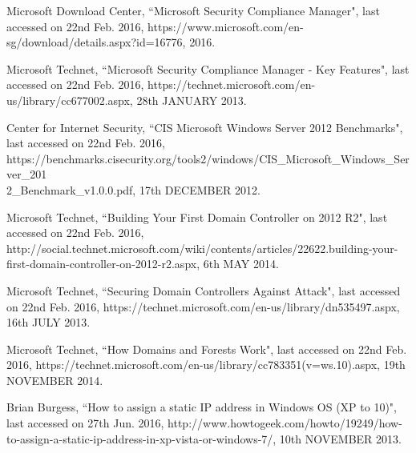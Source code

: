 \documentclass[12pt]{extarticle}
\begin{document}
\begin{thebibliography}{99}
Microsoft Download Center, ``Microsoft Security Compliance Manager", last accessed on 22nd Feb. 2016, https://www.microsoft.com/en-sg/download/details.aspx?id=16776, 2016.


Microsoft Technet, ``Microsoft Security Compliance Manager - Key Features", last accessed on 22nd Feb. 2016, https://technet.microsoft.com/en-us/library/cc677002.aspx, 28th JANUARY 2013.


Center for Internet Security, ``CIS Microsoft Windows Server 2012 Benchmarks", last accessed on 22nd Feb. 2016, https://benchmarks.cisecurity.org/tools2/windows/CIS\_Microsoft\_Windows\_Server\_201\\2\_Benchmark\_v1.0.0.pdf, 17th DECEMBER 2012.


Microsoft Technet, ``Building Your First Domain Controller on 2012 R2", last accessed on 22nd Feb. 2016, http://social.technet.microsoft.com/wiki/contents/articles/22622.building-your-first-domain-controller-on-2012-r2.aspx, 6th MAY 2014.


Microsoft Technet, ``Securing Domain Controllers Against Attack", last accessed on 22nd Feb. 2016, https://technet.microsoft.com/en-us/library/dn535497.aspx, 16th JULY 2013.


Microsoft Technet, ``How Domains and Forests Work", last accessed on 22nd Feb. 2016, https://technet.microsoft.com/en-us/library/cc783351(v=ws.10).aspx, 19th NOVEMBER 2014. 


Brian Burgess, ``How to assign a static IP address in Windows OS (XP to 10)", last accessed on 27th Jun. 2016, http://www.howtogeek.com/howto/19249/how-to-assign-a-static-ip-address-in-xp-vista-or-windows-7/, 10th NOVEMBER 2013.

\end{thebibliography}
\end{document}
